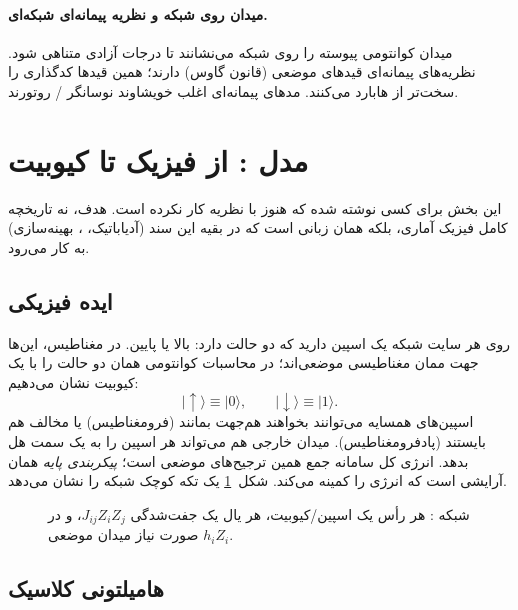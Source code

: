 \paragraph{میدان روی شبکه و نظریه پیمانه‌ای شبکه‌ای.}
میدان کوانتومی پیوسته را روی شبکه می‌نشانند تا درجات آزادی متناهی شود. نظریه‌های پیمانه‌ای قیدهای موضعی (قانون گاوس) دارند؛ همین قیدها کدگذاری را سخت‌تر از هابارد می‌کنند. مدهای پیمانه‌ای اغلب خویشاوند نوسانگر / روتورند.

\section{مدل : از فیزیک تا کیوبیت}
\label{sec:ising}

این بخش برای کسی نوشته شده که هنوز با نظریه  کار نکرده است. هدف، نه تاریخچه کامل فیزیک آماری، بلکه همان زبانی است که در بقیه این سند (آدیاباتیک، ، بهینه‌سازی) به کار می‌رود.

\subsection{ایده فیزیکی}

روی هر سایت شبکه یک اسپین دارید که دو حالت دارد: بالا یا پایین. در مغناطیس، این‌ها جهت ممان مغناطیسی موضعی‌اند؛ در محاسبات کوانتومی همان دو حالت را با یک کیوبیت نشان می‌دهیم:
\begin{equation}
	\lvert\uparrow\rangle \equiv \lvert0\rangle,
	\qquad
	\lvert\downarrow\rangle \equiv \lvert1\rangle.
\end{equation}
اسپین‌های همسایه می‌توانند بخواهند هم‌جهت بمانند (فرومغناطیس) یا مخالف هم بایستند (پادفرومغناطیس). میدان خارجی هم می‌تواند هر اسپین را به یک سمت هل بدهد. انرژی کل سامانه جمع همین ترجیح‌های موضعی است؛ \emph{پیکربندی پایه} همان آرایشی است که انرژی را کمینه می‌کند. شکل~\ref{fig:ising-lattice} یک تکه کوچک شبکه را نشان می‌دهد.

\begin{figure}[htbp]
	\centering
	\begin{latin}
		\resizebox{0.95\textwidth}{!}{%
		}
	\end{latin}
	\caption{شبکه : هر رأس یک اسپین/کیوبیت، هر یال یک جفت‌شدگی $J_{ij}Z_iZ_j$، و در صورت نیاز میدان موضعی $h_i Z_i$.}
	\label{fig:ising-lattice}
\end{figure}

\subsection{هامیلتونی کلاسیک}

